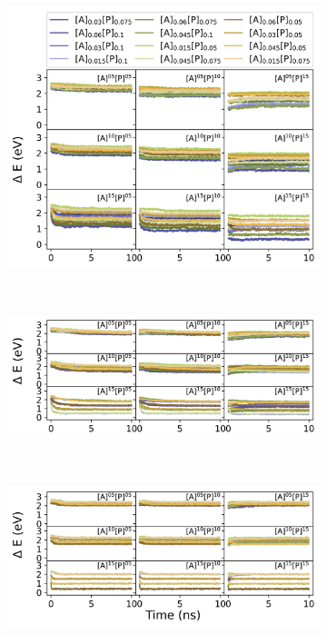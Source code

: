 \begin{figure}
\centering
\begin{subfigure}[b]{0.8\textwidth}
    \includegraphics[width=\textwidth]{figures/MD/Env/Jan25_EDelta.jpeg}
\end{subfigure}\\
\begin{subfigure}[b]{0.8\textwidth}
    \includegraphics[width=\textwidth]{figures/MD/Env/Jan50_EDelta.jpeg}
    \end{subfigure}\\
\begin{subfigure}[b]{0.8\textwidth}
    \includegraphics[width=\textwidth]{figures/MD/Env/Jan75_EDelta.jpeg}

\end{subfigure}
\end{figure}
